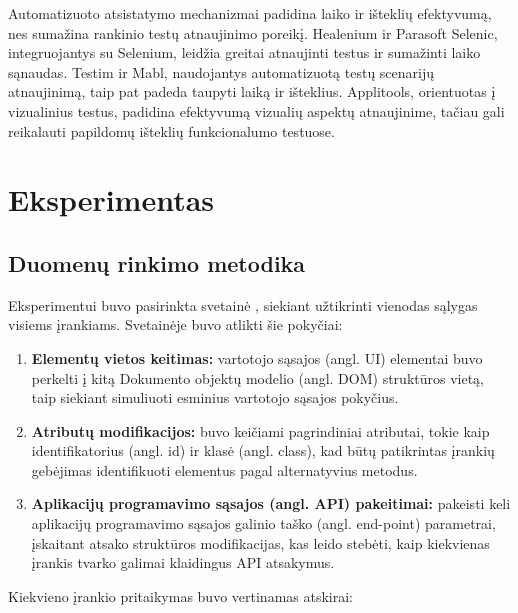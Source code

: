 \documentclass[
]{VUMIFPSkursinis}
\begin{document}
Automatizuoto atsistatymo mechanizmai padidina laiko ir išteklių efektyvumą, nes sumažina rankinio testų atnaujinimo poreikį. Healenium ir Parasoft Selenic, integruojantys su Selenium, leidžia greitai atnaujinti testus ir sumažinti laiko sąnaudas. Testim ir Mabl, naudojantys automatizuotą testų scenarijų atnaujinimą, taip pat padeda taupyti laiką ir išteklius. Applitools, orientuotas į vizualinius testus, padidina efektyvumą vizualių aspektų atnaujinime, tačiau gali reikalauti papildomų išteklių funkcionalumo testuose.

\section{Eksperimentas}
\subsection{Duomenų rinkimo metodika}

Eksperimentui buvo pasirinkta svetainė \cite{Demo}, siekiant užtikrinti vienodas sąlygas visiems įrankiams. Svetainėje buvo atlikti šie pokyčiai:

\begin{enumerate}
    \item \textbf{Elementų vietos keitimas:} vartotojo sąsajos (angl. UI) elementai buvo perkelti į kitą Dokumento objektų modelio (angl. DOM) struktūros vietą, taip siekiant simuliuoti esminius vartotojo sąsajos pokyčius.
    \item \textbf{Atributų modifikacijos:} buvo keičiami pagrindiniai atributai, tokie kaip identifikatorius (angl. id) ir klasė (angl. class), kad būtų patikrintas įrankių gebėjimas identifikuoti elementus pagal alternatyvius metodus.
    \item \textbf{Aplikacijų programavimo sąsajos (angl. API) pakeitimai:}  pakeisti keli aplikacijų programavimo sąsajos galinio taško (angl. end-point) parametrai, įskaitant atsako struktūros modifikacijas, kas leido stebėti, kaip kiekvienas įrankis tvarko galimai klaidingus API atsakymus.
\end{enumerate}

Kiekvieno įrankio pritaikymas buvo vertinamas atskirai:
\end{document}
